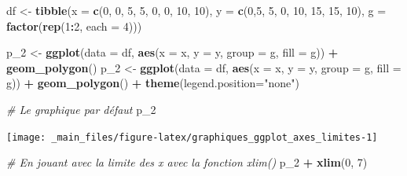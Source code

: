 \documentclass[
  11pt,
]{book}
\newenvironment{Shaded}{\begin{snugshade}}{\end{snugshade}}
\newcommand{\CommentTok}[1]{\textcolor[rgb]{0.56,0.35,0.01}{\textit{#1}}}
\newcommand{\DataTypeTok}[1]{\textcolor[rgb]{0.13,0.29,0.53}{#1}}
\newcommand{\DecValTok}[1]{\textcolor[rgb]{0.00,0.00,0.81}{#1}}
\newcommand{\KeywordTok}[1]{\textcolor[rgb]{0.13,0.29,0.53}{\textbf{#1}}}
\newcommand{\NormalTok}[1]{#1}
\newcommand{\OperatorTok}[1]{\textcolor[rgb]{0.81,0.36,0.00}{\textbf{#1}}}
\newcommand{\StringTok}[1]{\textcolor[rgb]{0.31,0.60,0.02}{#1}}
\numberwithin{equation}{section}
\numberwithin{countremarque}{section}
\begin{document}
\begin{Shaded}
\begin{Highlighting}[]
\NormalTok{df \textless{}{-}}\StringTok{ }\KeywordTok{tibble}\NormalTok{(}\DataTypeTok{x =} \KeywordTok{c}\NormalTok{(}\DecValTok{0}\NormalTok{, }\DecValTok{0}\NormalTok{, }\DecValTok{5}\NormalTok{, }\DecValTok{5}\NormalTok{, }\DecValTok{0}\NormalTok{, }\DecValTok{0}\NormalTok{, }\DecValTok{10}\NormalTok{, }\DecValTok{10}\NormalTok{), }
             \DataTypeTok{y =} \KeywordTok{c}\NormalTok{(}\DecValTok{0}\NormalTok{,}\DecValTok{5}\NormalTok{, }\DecValTok{5}\NormalTok{, }\DecValTok{0}\NormalTok{, }\DecValTok{10}\NormalTok{, }\DecValTok{15}\NormalTok{, }\DecValTok{15}\NormalTok{, }\DecValTok{10}\NormalTok{),}
             \DataTypeTok{g =} \KeywordTok{factor}\NormalTok{(}\KeywordTok{rep}\NormalTok{(}\DecValTok{1}\OperatorTok{:}\DecValTok{2}\NormalTok{, }\DataTypeTok{each =} \DecValTok{4}\NormalTok{)))}

\NormalTok{p\_}\DecValTok{2}\NormalTok{ \textless{}{-}}\StringTok{ }\KeywordTok{ggplot}\NormalTok{(}\DataTypeTok{data =}\NormalTok{ df, }\KeywordTok{aes}\NormalTok{(}\DataTypeTok{x =}\NormalTok{ x, }\DataTypeTok{y =}\NormalTok{ y, }\DataTypeTok{group =}\NormalTok{ g, }\DataTypeTok{fill =}\NormalTok{ g)) }\OperatorTok{+}
\StringTok{  }\KeywordTok{geom\_polygon}\NormalTok{()}
\NormalTok{p\_}\DecValTok{2}\NormalTok{ \textless{}{-}}\StringTok{ }\KeywordTok{ggplot}\NormalTok{(}\DataTypeTok{data =}\NormalTok{ df, }\KeywordTok{aes}\NormalTok{(}\DataTypeTok{x =}\NormalTok{ x, }\DataTypeTok{y =}\NormalTok{ y, }\DataTypeTok{group =}\NormalTok{ g, }\DataTypeTok{fill =}\NormalTok{ g)) }\OperatorTok{+}
\StringTok{  }\KeywordTok{geom\_polygon}\NormalTok{() }\OperatorTok{+}
\StringTok{  }\KeywordTok{theme}\NormalTok{(}\DataTypeTok{legend.position=}\StringTok{"none"}\NormalTok{)}

\CommentTok{\# Le graphique par défaut}
\NormalTok{p\_}\DecValTok{2}
\end{Highlighting}
\end{Shaded}

\begin{center}\texttt{[image: \_main\_files/figure-latex/graphiques\_ggplot\_axes\_limites-1]} \end{center}

\begin{Shaded}
\begin{Highlighting}[]
\CommentTok{\# En jouant avec la limite des x avec la fonction xlim()}
\NormalTok{p\_}\DecValTok{2} \OperatorTok{+}\StringTok{ }\KeywordTok{xlim}\NormalTok{(}\DecValTok{0}\NormalTok{, }\DecValTok{7}\NormalTok{)}
\end{Highlighting}
\end{Shaded}
\end{document}
